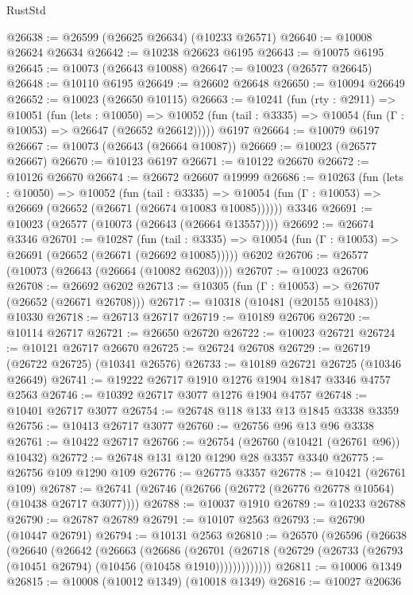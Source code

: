 \begin{lexlean}{RustStd}
\begin{coremodule}
@26638 := @26599 (@26625 @26634) (@10233 @26571)
@26640 := @10008 @26624 @26634
@26642 := @10238 @26623 @6195
@26643 := @10075 @6195
@26645 := @10073 (@26643 @10088)
@26647 := @10023 (@26577 @26645)
@26648 := @10110 @6195
@26649 := @26602 @26648
@26650 := @10094 @26649
@26652 := @10023 (@26650 @10115)
@26663 := @10241
    (fun (rty : @2911) =>
    @10051
      (fun (lets : @10050) =>
      @10052 (fun (tail : @3335) => @10054 (fun (Γ : @10053) => @26647 (@26652 @26612)))))
    @6197
@26664 := @10079 @6197
@26667 := @10073 (@26643 (@26664 @10087))
@26669 := @10023 (@26577 @26667)
@26670 := @10123 @6197
@26671 := @10122 @26670
@26672 := @10126 @26670
@26674 := @26672 @26607 @19999
@26686 := @10263
    (fun (lets : @10050) =>
    @10052
      (fun (tail : @3335) =>
      @10054 (fun (Γ : @10053) => @26669 (@26652 (@26671 (@26674 @10083 @10085))))))
    @3346
@26691 := @10023 (@26577 (@10073 (@26643 (@26664 @13557))))
@26692 := @26674 @3346
@26701 := @10287
    (fun (tail : @3335) => @10054 (fun (Γ : @10053) => @26691 (@26652 (@26671 (@26692 @10085)))))
    @6202
@26706 := @26577 (@10073 (@26643 (@26664 (@10082 @6203))))
@26707 := @10023 @26706
@26708 := @26692 @6202
@26713 := @10305 (fun (Γ : @10053) => @26707 (@26652 (@26671 @26708)))
@26717 := @10318 (@10481 (@20155 @10483)) @10330
@26718 := @26713 @26717
@26719 := @10189 @26706
@26720 := @10114 @26717
@26721 := @26650 @26720
@26722 := @10023 @26721
@26724 := @10121 @26717 @26670
@26725 := @26724 @26708
@26729 := @26719 (@26722 @26725) (@10341 @26576)
@26733 := @10189 @26721 @26725 (@10346 @26649)
@26741 := @19222 @26717 @1910 @1276 @1904 @1847 @3346 @4757 @2563
@26746 := @10392 @26717 @3077 @1276 @1904 @4757
@26748 := @10401 @26717 @3077
@26754 := @26748 @118 @133 @13 @1845 @3338 @3359
@26756 := @10413 @26717 @3077
@26760 := @26756 @96 @13 @96 @3338
@26761 := @10422 @26717
@26766 := @26754 (@26760 (@10421 (@26761 @96)) @10432)
@26772 := @26748 @131 @120 @1290 @28 @3357 @3340
@26775 := @26756 @109 @1290 @109
@26776 := @26775 @3357
@26778 := @10421 (@26761 @109)
@26787 := @26741 (@26746 (@26766 (@26772 (@26776 @26778 @10564) (@10438 @26717 @3077))))
@26788 := @10037 @1910
@26789 := @10233 @26788
@26790 := @26787 @26789
@26791 := @10107 @2563
@26793 := @26790 (@10447 @26791)
@26794 := @10131 @2563
@26810 := @26570
    (@26596
      (@26638
        (@26640
          (@26642
            (@26663
              (@26686
                (@26701
                  (@26718 (@26729 (@26733 (@26793 (@10451 @26794) (@10456 (@10458 @1910)))))))))))))
@26811 := @10006 @1349
@26815 := @10008 (@10012 @1349) (@10018 @1349)
@26816 := @10027 @20636

\end{coremodule}
\end{lexlean}
